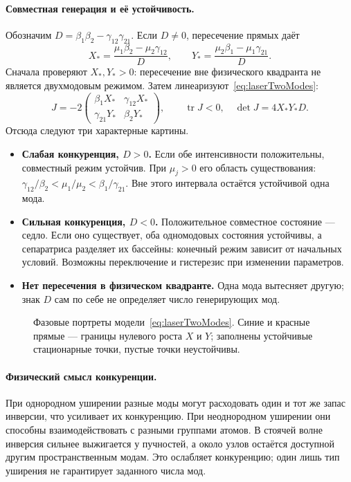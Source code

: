 \paragraph{Совместная генерация и её устойчивость.}
Обозначим $D=\beta_1\beta_2-\gamma_{12}\gamma_{21}$. Если $D\ne0$, пересечение прямых даёт
\begin{equation}
 X_*=\frac{\mu_1\beta_2-\mu_2\gamma_{12}}{D},\qquad
 Y_*=\frac{\mu_2\beta_1-\mu_1\gamma_{21}}{D}.
\end{equation}
Сначала проверяют $X_*,Y_*>0$: пересечение вне физического квадранта не является двухмодовым режимом. Затем линеаризуют~\eqref{eq:laserTwoModes}:
\begin{equation}
 J=-2\begin{pmatrix}
 \beta_1X_*&\gamma_{12}X_*\\
 \gamma_{21}Y_*&\beta_2Y_*
 \end{pmatrix},\qquad
 \operatorname{tr}J<0,\quad \det J=4X_*Y_*D.
\end{equation}
Отсюда следуют три характерные картины.
\begin{itemize}
 \item \textbf{Слабая конкуренция, $D>0$.} Если обе интенсивности положительны, совместный режим устойчив. При $\mu_j>0$ его область существования:
 $\gamma_{12}/\beta_2<\mu_1/\mu_2<\beta_1/\gamma_{21}$.
 Вне этого интервала остаётся устойчивой одна мода.
 \item \textbf{Сильная конкуренция, $D<0$.} Положительное совместное состояние --- седло. Если оно существует, оба одномодовых состояния устойчивы, а сепаратриса разделяет их бассейны: конечный режим зависит от начальных условий. Возможны переключение и гистерезис при изменении параметров.
 \item \textbf{Нет пересечения в физическом квадранте.} Одна мода вытесняет другую; знак $D$ сам по себе не определяет число генерирующих мод.
\end{itemize}

\begin{figure}[H]\centering

\caption{Фазовые портреты модели~\eqref{eq:laserTwoModes}. Синие и красные прямые --- границы нулевого роста $X$ и $Y$; заполнены устойчивые стационарные точки, пустые точки неустойчивы.}
\end{figure}

\paragraph{Физический смысл конкуренции.}
При однородном уширении разные моды могут расходовать один и тот же запас инверсии, что усиливает их конкуренцию. При неоднородном уширении они способны взаимодействовать с разными группами атомов. В стоячей волне инверсия сильнее выжигается у пучностей, а около узлов остаётся доступной другим пространственным модам. Это ослабляет конкуренцию; один лишь тип уширения не гарантирует заданного числа мод.

